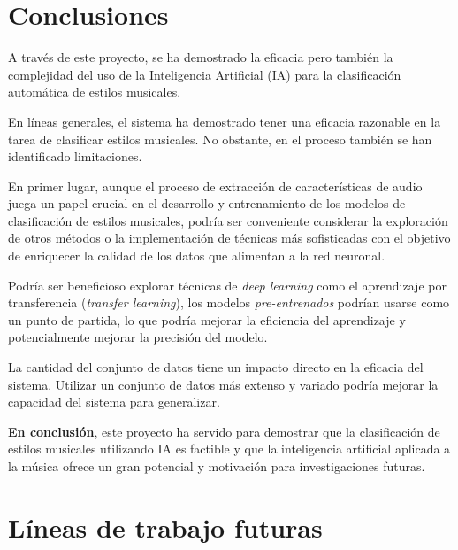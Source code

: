 
\section{Conclusiones}
A través de este proyecto, se ha demostrado la eficacia pero también la complejidad del uso de la Inteligencia Artificial (IA) para la clasificación automática de estilos musicales. 

En líneas generales, el sistema ha demostrado tener una eficacia razonable en la tarea de clasificar estilos musicales. No obstante, en el proceso también se han identificado limitaciones.

En primer lugar, aunque el proceso de extracción de características de audio juega un papel crucial en el desarrollo y entrenamiento de los modelos de clasificación de estilos musicales, podría ser conveniente considerar la exploración de otros métodos o la implementación de técnicas más sofisticadas con el objetivo de enriquecer la calidad de los datos que alimentan a la red neuronal.

Podría ser beneficioso explorar técnicas de \textit{deep learning} como el aprendizaje por transferencia (\textit{transfer learning}), los modelos \textit{pre-entrenados} podrían usarse como un punto de partida, lo que podría mejorar la eficiencia del aprendizaje y potencialmente mejorar la precisión del modelo.

La cantidad del conjunto de datos tiene un impacto directo en la eficacia del sistema. Utilizar un conjunto de datos más extenso y variado podría mejorar la capacidad del sistema para generalizar.

\textbf{En conclusión}, este proyecto ha servido para demostrar que la clasificación de estilos musicales utilizando IA es factible y que la inteligencia artificial aplicada a la música ofrece un gran potencial y motivación para investigaciones futuras.

\section{Líneas de trabajo futuras}

